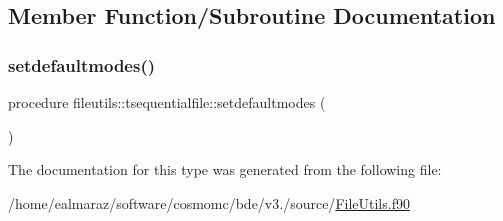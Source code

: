 \subsection{Member Function/\+Subroutine Documentation}
\mbox{\label{structfileutils_1_1tsequentialfile_abbadf70c5d0e8957c0cc4dbf3b463c67}} 
\subsubsection{\texorpdfstring{setdefaultmodes()}{setdefaultmodes()}}
{\footnotesize\ttfamily procedure fileutils\+::tsequentialfile\+::setdefaultmodes (\begin{DoxyParamCaption}{ }\end{DoxyParamCaption})\hspace{0.3cm}{\ttfamily [private]}}



The documentation for this type was generated from the following file\+:\begin{DoxyCompactItemize}
\item 
/home/ealmaraz/software/cosmomc/bde/v3./source/\mbox{\hyperlink{FileUtils_8f90}{File\+Utils.\+f90}}\end{DoxyCompactItemize}
